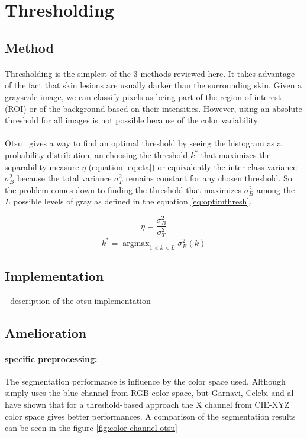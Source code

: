 \documentclass[a4paper,10pt]{article}
\DeclareMathOperator*{\argmax}{argmax}
\begin{document}
\section{Thresholding}
\subsection{Method}
\paragraph{}
Thresholding is the simplest of the 3 methods reviewed here. It takes advantage of the fact that skin lesions are 
usually darker than the surrounding skin. Given a grayscale image, we can 
classify pixels as being part of the region of interest (ROI) or of the 
background based on their intensities. However, using an absolute threshold for all images is not possible because of the color variability. 
\paragraph{} Otsu~\cite{Otsu1979} 
gives a way to find an optimal threshold by seeing the histogram as a probability distribution, an choosing the threshold $k^*$ that maximizes the separability measure $\eta$ (equation \ref{eq:eta}) or equivalently the inter-class variance $\sigma_B^2$ because the total variance $\sigma_T^2$ remains constant for any chosen threshold. So the problem comes down to finding the threshold that maximizes $\sigma_B^2$ among the $L$ possible levels of gray as defined in the equation \ref{eq:optimthresh}. 

\begin{equation} \label{eq:eta}
\eta=\frac{\sigma_B^2}{\sigma_T^2} 
\end{equation}
\begin{equation} \label{eq:optimthresh}
  k^* = \argmax_{1<k<L} \sigma_B^2(k)   
\end{equation}

\subsection{Implementation}
- description of the otsu implementation

\subsection{Amelioration}
\paragraph{specific preprocessing:}
The segmentation performance is influence by the color space used. Although~\cite{mendonca_comparison_2007} simply uses the blue channel from RGB color space, but 
Garnavi, Celebi and al~\cite{Garnavi2010} have shown that for a 
threshold-based approach the X channel from CIE-XYZ color space gives better performances. A comparison of the segmentation results can be seen in the figure \ref{fig:color-channel-otsu}
\end{document}
